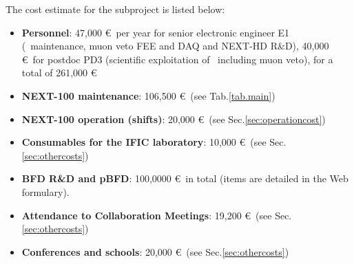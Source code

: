The cost estimate for the \sIFIC subproject is listed below:
\begin{itemize}[noitemsep,topsep=0pt,parsep=0pt,partopsep=0pt]
    \item {\bf Personnel}: 47,000 \euro\ per year for senior electronic engineer E1 (\Next\ maintenance, muon veto FEE and DAQ and NEXT-HD R\&D), 40,000 \euro\ for postdoc PD3 (scientific exploitation of \Next\ including muon veto), for a total of 261,000 \euro  
    \item {\bf NEXT-100 maintenance}: 106,500 \euro\ (see Tab.\ref{tab.main})
    \item {\bf NEXT-100 operation (shifts)}: 20,000 \euro\ (see Sec.\ref{sec:operationcost})
    \item {\bf Consumables for the IFIC laboratory}: 10,000 \euro\ (see Sec.\ref{sec:othercosts})
    \item {\bf BFD R\&D and pBFD}: 100,0000 \euro\ in total (items are detailed in the Web formulary). 
    \item {\bf Attendance to Collaboration Meetings}: 19,200 \euro\ (see Sec.\ref{sec:othercosts})
    \item {\bf Conferences and schools}: 20,000 \euro\ (see Sec.\ref{sec:othercosts})
\end{itemize}


